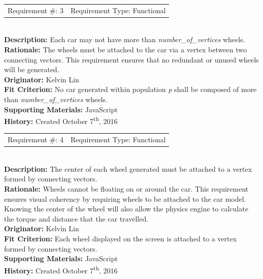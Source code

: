 \documentclass[12pt, titlepage]{article}
\begin{document}
\begin{reqbox}
%
\begin{tabular}{cc}
Requirement \#: 3 & Requirement Type: Functional \\
\end{tabular} \\
%
\textbf{Description:} Each car may not have more than 
\textit{number\_of\_vertices} wheels. \\
\textbf{Rationale:}  The wheels must be attached to the car via a vertex between 
two connecting vectors. This requirement ensures that no redundant or unused 
wheels will be generated.\\
\textbf{Originator:} Kelvin Lin\\
\textbf{Fit Criterion:} No car generated within population \textit{p} shall be 
composed of more than \textit{number\_of\_vertices} wheels.\\
%  
\textbf{Supporting Materials:} JavaScript \\
\textbf{History:} Created October 7\textsuperscript{th}, 2016
%
\end{reqbox}

\newpage

\begin{reqbox}
%
\begin{tabular}{cc}
Requirement \#: 4 & Requirement Type: Functional \\
\end{tabular} \\
%
\textbf{Description:} The center of each wheel generated must be attached to a 
vertex formed by connecting vectors. \\
\textbf{Rationale:}  Wheels cannot be floating on or around the car. This 
requirement ensures visual coherency by requiring wheels to be attached to the 
car model. Knowing the center of the wheel will also allow the physics engine to 
calculate the torque and distance that the car travelled.\\
\textbf{Originator:} Kelvin Lin\\
\textbf{Fit Criterion:} Each wheel displayed on the screen is attached to a 
vertex formed by connecting vectors.\\
%  
\textbf{Supporting Materials:} JavaScript \\
\textbf{History:} Created October 7\textsuperscript{th}, 2016
%
\end{reqbox}
\end{document}
